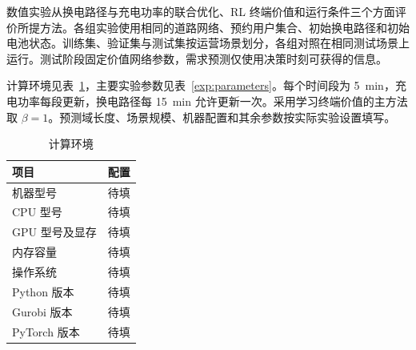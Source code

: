 \documentclass[12pt,a4paper,UTF8]{ctexart}
\numberwithin{equation}{section}
\begin{document}
数值实验从换电路径与充电功率的联合优化、RL 终端价值和运行条件三个方面评价所提方法。各组实验使用相同的道路网络、预约用户集合、初始换电路径和初始电池状态。训练集、验证集与测试集按运营场景划分，各组对照在相同测试场景上运行。测试阶段固定价值网络参数，需求预测仅使用决策时刻可获得的信息。

计算环境见表~\ref{exp:environment}，主要实验参数见表~\ref{exp:parameters}。每个时间段为 5~min，充电功率每段更新，换电路径每 15~min 允许更新一次。采用学习终端价值的主方法取 $\beta=1$。预测域长度、场景规模、机器配置和其余参数按实际实验设置填写。

\begin{table}[!htbp]
  \centering
  \caption{计算环境}
  \label{exp:environment}
  \small
  \begin{tabularx}{0.88\linewidth}{@{}lX@{}}
    \toprule
    项目 & 配置 \\
    \midrule
    机器型号 & 待填 \\
    CPU 型号 & 待填 \\
    GPU 型号及显存 & 待填 \\
    内存容量 & 待填 \\
    操作系统 & 待填 \\
    Python 版本 & 待填 \\
    Gurobi 版本 & 待填 \\
    PyTorch 版本 & 待填 \\
    \bottomrule
  \end{tabularx}
\end{table}
\end{document}
